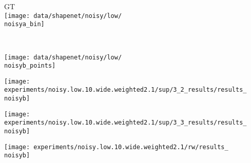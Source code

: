 {\begin{minipage}[t]{0.10\textwidth}
\end{minipage}
\begin{minipage}[t]{0.10\textwidth}
    \vspace{0px}\centering
    \hspace*{3mm}
    GT\\[-1px]
    \texttt{[image: data/shapenet/noisy/low/\\noisya\_bin]}
\end{minipage}
\\[-2px]
\hspace*{-6px}
\begin{minipage}[t]{0.02\textwidth}
    \vspace{0px}\centering
    \vspace{4.5mm}
\end{minipage}
\begin{minipage}[t]{0.10\textwidth}
   	\vspace{0px}\centering
   	\texttt{[image: data/shapenet/noisy/low/\\noisyb\_points]}
\end{minipage}
\begin{minipage}[t]{0.10\textwidth}
   	\vspace{0px}\centering
   	\texttt{[image: experiments/noisy.low.10.wide.weighted2.1/sup/3\_2\_results/results\_\\noisyb]}
\end{minipage}
\begin{minipage}[t]{0.10\textwidth}
   	\vspace{0px}\centering
   	\texttt{[image: experiments/noisy.low.10.wide.weighted2.1/sup/3\_3\_results/results\_\\noisyb]}
\end{minipage}
\begin{minipage}[t]{0.10\textwidth}
   	\vspace{0px}\centering
   	\texttt{[image: experiments/noisy.low.10.wide.weighted2.1/rw/results\_\\noisyb]}
\end{minipage}
\begin{minipage}[t]{0.10\textwidth}

\end{minipage}}
